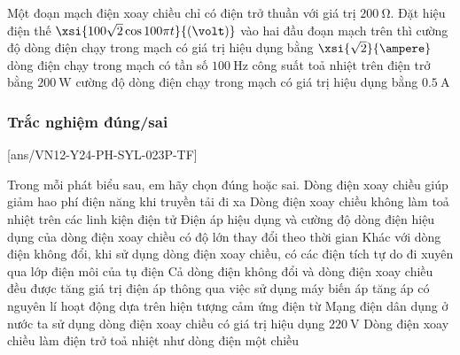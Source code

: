 \begin{ex}
	Một đoạn mạch điện xoay chiều chỉ có điện trở thuần với giá trị $\SI{200}{\ohm}$. Đặt hiệu điện thế $\xsi{100\sqrt{2}\cos100\pi t}{\left(\volt\right)}$ vào hai đầu đoạn mạch trên thì
	\choice
	{cường độ dòng điện chạy trong mạch có giá trị hiệu dụng bằng $\xsi{\sqrt{2}}{\ampere}$}
	{dòng điện chạy trong mạch có tần số $\SI{100}{\hertz}$}
	{công suất toả nhiệt trên điện trở bằng $\SI{200}{\watt}$}
	{\True cường độ dòng điện chạy trong mạch có giá trị hiệu dụng bằng $\SI{0.5}{\ampere}$}
	\loigiai{}
\end{ex}



\subsubsection{Trắc nghiệm đúng/sai}
\setcounter{ex}{0}
[ans/VN12-Y24-PH-SYL-023P-TF]
\begin{ex}
	Trong mỗi phát biểu sau, em hãy chọn đúng hoặc sai.
	\choiceTFt
	{\True Dòng điện xoay chiều giúp giảm hao phí điện năng khi truyền tải đi xa}
	{Dòng điện xoay chiều không làm toả nhiệt trên các linh kiện điện tử}
	{Điện áp hiệu dụng và cường độ dòng điện hiệu dụng của dòng điện xoay chiều có độ lớn thay đổi theo thời gian}
	{Khác với dòng điện không đổi, khi sử dụng dòng điện xoay chiều, có các điện tích tự do đi xuyên qua lớp điện môi của tụ điện}
	{Cả dòng điện không đổi và dòng điện xoay chiều đều được tăng giá trị điện áp thông qua việc sử dụng máy biến áp tăng áp có nguyên lí hoạt động dựa trên hiện tượng cảm ứng điện từ}
	{\True Mạng điện dân dụng ở nước ta sử dụng dòng điện xoay chiều có giá trị hiệu dụng $\SI{220}{\volt}$}
	{\True Dòng điện xoay chiều làm điện trở toả nhiệt như dòng điện một chiều}
	\loigiai{}
\end{ex}
